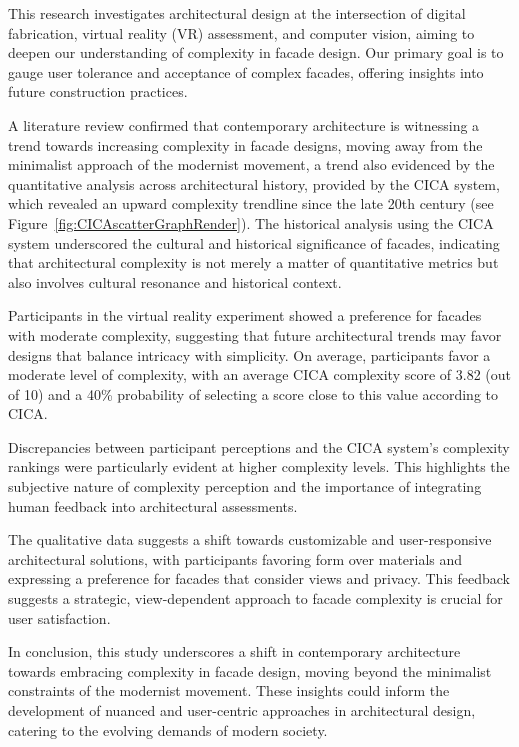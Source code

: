 


This research investigates architectural design at the intersection of digital fabrication, virtual reality (VR) assessment, and computer vision, aiming to deepen our understanding of complexity in facade design.
Our primary goal is to gauge user tolerance and acceptance of complex facades, offering insights into future construction practices.

A literature review confirmed that contemporary architecture is witnessing a trend towards increasing complexity in facade designs, moving away from the minimalist approach of the modernist movement, a trend also evidenced by the quantitative analysis across architectural history, provided by the CICA system, which revealed an upward complexity trendline since the late 20th century (see Figure~\ref{fig:CICAscatterGraphRender}).
The historical analysis using the CICA system underscored the cultural and historical significance of facades, indicating that architectural complexity is not merely a matter of quantitative metrics but also involves cultural resonance and historical context.

Participants in the virtual reality experiment showed a preference for facades with moderate complexity, suggesting that future architectural trends may favor designs that balance intricacy with simplicity.
On average, participants favor a moderate level of complexity, with an average CICA complexity score of 3.82 (out of 10) and a 40\% probability of selecting a score close to this value according to CICA\@.

Discrepancies between participant perceptions and the CICA system's complexity rankings were particularly evident at higher complexity levels.
This highlights the subjective nature of complexity perception and the importance of integrating human feedback into architectural assessments.

The qualitative data suggests a shift towards customizable and user-responsive architectural solutions, with participants favoring form over materials and expressing a preference for facades that consider views and privacy.
This feedback suggests a strategic, view-dependent approach to facade complexity is crucial for user satisfaction.

In conclusion, this study underscores a shift in contemporary architecture towards embracing complexity in facade design, moving beyond the minimalist constraints of the modernist movement.
These insights could inform the development of nuanced and user-centric approaches in architectural design, catering to the evolving demands of modern society.
